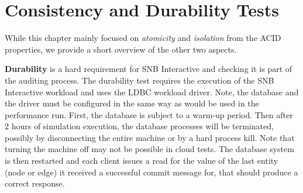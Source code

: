 


\section{Consistency and Durability Tests}
\label{sec:cd}

While this chapter mainly focused on \emph{atomicity} and \emph{isolation} from the ACID properties, we provide a short overview of the other two aspects.

{\bf Durability} is a hard requirement for SNB Interactive and checking it is part of the 
auditing process. 
The durability test requires the execution of the SNB Interactive workload and uses the LDBC workload driver.
Note, the database and the driver must be configured in the same way as would be used in the performance run.
First, the database is subject to a warm-up period.
Then after 2 hours of simulation execution, the database processes will be terminated, possibly by disconnecting the entire machine or by a hard process kill.
Note that turning the machine off may not be possible in cloud tests.
The database system is then restarted and each client issues a read for the value of the last entity (node or edge) it received a successful commit message for, that should produce a correct response.


